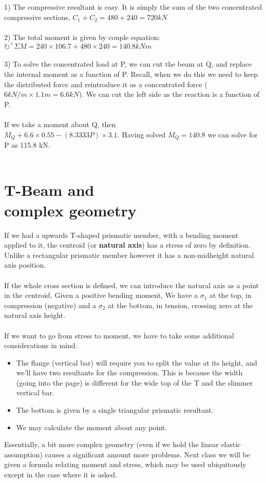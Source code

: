 \documentclass[10pt, twocolumn]{report}
\begin{document}
   1) The compressive resultant is easy. It is simply the sum of the two concentrated compressive sections, $C_1 + C_2 = 480 + 240 = 720 kN$\\\\
   2) The total moment is given by couple equation: $\circlearrowright^+ \Sigma M = 240 \times 106.7 + 480 \times 240 = 140.8 kN m $ \\\\
   3) To solve the concentrated load at P, we can cut the beam at Q, and replace the internal moment as a function of P. Recall, when we do this we need to keep the distributed force and reintroduce it as a concentrated force ($6kN/m\times1.1m = 6.6 kN$). We can cut the left side as the reaction is a function of P. \\\\ If we take a moment about Q, then \\$M_Q + 6.6 \times 0.55 - (8.3333P) \times 3.1$. Having solved $M_Q = 140.8$ we can solve for P as 115.8 kN. \\\\

   \section{T-Beam and \\ complex geometry}
   If we had a upwards T-shaped prismatic member, with a bending moment applied to it, the centroid (or \textbf{natural axis}) has a stress of zero by definition. Unlike a rectangular prismatic member however it has a non-midheight natural axis position. \\\\ If the whole cross section is defined, we can introduce the natural axis as a point in the centroid. Given a positive bending moment, We have a $\sigma_1$ at the top, in compression (negative) and a $\sigma_2$ at the bottom, in tension, crossing zero at the natural axis height. \\\\ If we want to go from stress to moment, we have to take some additional considerations in mind.
   \begin{itemize}
     \item The flange (vertical bar) will require you to split the value at its height, and we'll have two resultants for the compression. This is because the width (going into the page) is different for the wide top of the T  and the slimmer vertical bar.
    \item The bottom is given by a single triangular prismatic resultant.
    \item We may calculate the moment about any point.
   \end{itemize}
   Essentially, a bit more complex geometry (even if we hold the linear elastic assumption) causes a significant amount more problems. Next class we will be given a formula relating moment and stress, which may be used ubiquitously except in the case where it is asked.
\end{document}
